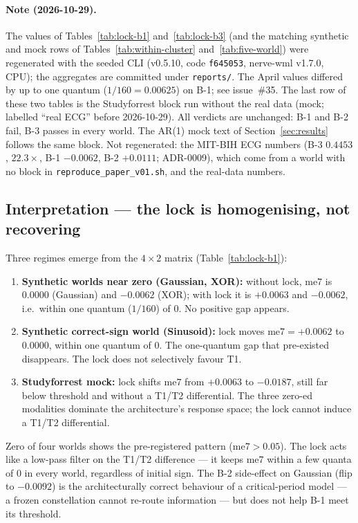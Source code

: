 \documentclass{article}
\begin{document}
\paragraph{Note (2026-10-29).} The values of Tables~\ref{tab:lock-b1}
and~\ref{tab:lock-b3} (and the matching synthetic and mock rows of
Tables~\ref{tab:within-cluster} and~\ref{tab:five-world}) were
regenerated with the seeded CLI (v0.5.10, code \texttt{f645053},
nerve-wml v1.7.0, CPU); the aggregates are committed under
\texttt{reports/}. The April values differed by up to one quantum
($1/160 = 0.00625$) on B-1; see issue~\#35. The last row of
these two tables is the Studyforrest block run without the real data
(mock; labelled ``real ECG'' before 2026-10-29). All verdicts are unchanged: B-1 and B-2 fail, B-3 passes in
every world. The AR(1) mock text of Section~\ref{sec:results} follows the same
block. Not regenerated: the MIT-BIH ECG numbers (B-3 $0.4453$,
$22.3\times$, B-1 $-0.0062$, B-2 $+0.0111$; ADR-0009), which come from
a world with no block in \texttt{reproduce\_paper\_v01.sh}, and the
real-data numbers.

\subsection{Interpretation --- the lock is homogenising, not recovering}

Three regimes emerge from the $4 \times 2$ matrix
(Table~\ref{tab:lock-b1}):
\begin{enumerate}
  \item \textbf{Synthetic worlds near zero (Gaussian, XOR):} without
        lock, $\mathrm{me7}$ is $0.0000$ (Gaussian) and $-0.0062$
        (XOR); with lock it is $+0.0063$ and $-0.0062$, i.e.\ within
        one quantum ($1/160$) of $0$. No positive gap appears.
  \item \textbf{Synthetic correct-sign world (Sinusoid):} lock
        moves $\mathrm{me7} = +0.0062$ to $0.0000$, within one
        quantum of $0$. The one-quantum gap that pre-existed
        disappears. The lock does not selectively favour T1.
  \item \textbf{Studyforrest mock:} lock shifts
        $\mathrm{me7}$ from $+0.0063$ to $-0.0187$, still far below
        threshold and without a T1/T2 differential. The
        three zero-ed modalities dominate the architecture's
        response space; the lock cannot induce a T1/T2 differential.
\end{enumerate}

Zero of four worlds shows the pre-registered pattern
($\mathrm{me7} > 0.05$). The lock acts like a low-pass filter on
the T1/T2 difference --- it keeps $\mathrm{me7}$ within a few
quanta of $0$ in every world, regardless of initial sign. The B-2 side-effect
on Gaussian (flip to $-0.0092$) is the architecturally correct
behaviour of a critical-period model --- a frozen constellation
cannot re-route information --- but does not help B-1 meet its
threshold.
\end{document}
